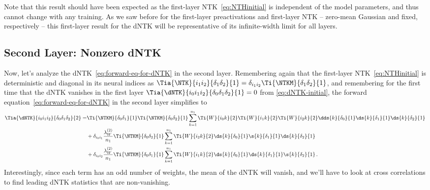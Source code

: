 Note that this result should have been expected as the first-layer NTK~\eqref{eq:NTHinitial} is independent of the model parameters, and thus cannot change with any training. As we saw before for the first-layer preactivations and first-layer NTK -- zero-mean Gaussian and fixed, respectively -- this first-layer result for the dNTK will be representative of its infinite-width limit for all layers.


\subsection{Second Layer: Nonzero dNTK}
\label{subsec:second-layer-nonzero-dNTK}
Now, let's analyze the 
dNTK~\eqref{eq:forward-eq-for-dNTK} in the second layer.
Remembering again that the first-layer NTK~\eqref{eq:NTHinitial} is deterministic and diagonal in its neural indices as $\Tia{\NTK}{i_1i_2}{\delta_1\delta_2}{1}=\delta_{i_1i_2}\Ti{\NTKM}{\delta_1\delta_2}{1}$, and remembering for the first time
that the dNTK vanishes in the first layer
$\Tia{\dNTK}{i_0i_1i_2}{\delta_0\delta_1\delta_2}{1}=0$ from  \eqref{eq:dNTK-initial}, the forward equation~\eqref{eq:forward-eq-for-dNTK} in the second layer simplifies to
\begin{align}\label{eq:forward-eq-for-dNTK-second-layer}
\Tia{\dNTK}{i_0i_1i_2}{\delta_0\delta_1\delta_2}{2}=&\Ti{\NTKM}{\delta_0\delta_1}{1}\Ti{\NTKM}{\delta_0\delta_2}{1}\sum_{k=1}^{n_{1}}\Ti{W}{i_0 k}{2}\Ti{W}{i_1 k}{2}\Ti{W}{i_2 k}{2}\dds{k}{\delta_0}{1}\ds{k}{\delta_1}{1}\ds{k}{\delta_2}{1}\, \nonumber\\
&+\delta_{i_0i_1}\frac{\lambda_{W}^{(2)}}{n_1}\Ti{\NTKM}{\delta_0\delta_2}{1}\sum_{k=1}^{n_{1}}\Ti{W}{i_2 k}{2}\ds{k}{\delta_0}{1}\s{k}{\delta_1}{1}\ds{k}{\delta_2}{1}\, \nonumber\\
&+\delta_{i_0i_2}\frac{\lambda_{W}^{(2)}}{n_1}\Ti{\NTKM}{\delta_0\delta_1}{1}\sum_{k=1}^{n_{1}}\Ti{W}{i_1 k}{2}\ds{k}{\delta_0}{1}\ds{k}{\delta_1}{1}\s{k}{\delta_2}{1}\, .
\end{align}
Interestingly, since each term has an odd number of weights, the mean of the dNTK will vanish, and we'll have to look at cross correlations to find leading dNTK statistics that are non-vanishing.

